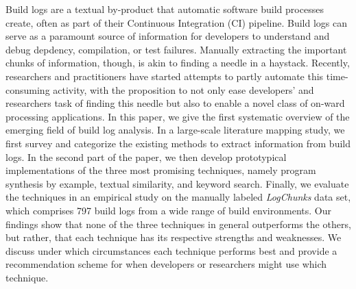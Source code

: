 Build logs are a textual by-product that automatic software build processes
create, often as part of their Continuous Integration (CI)
pipeline.
Build logs can serve as a paramount source of
information for developers to understand and debug depdency, compilation, or
test failures.
Manually
extracting the important chunks of information, though, is akin to
finding a needle in a haystack.
Recently, researchers and practitioners have started attempts to partly
automate
this time-consuming activity, with the proposition to not only ease
developers' and researchers task of finding this needle but also to enable a novel class of
on-ward processing applications.
In this paper, we give the first systematic overview of the emerging field of build log analysis.
In a large-scale literature mapping study, we first survey and categorize the existing methods to
extract information from build logs.
In the second part of the paper, we then develop prototypical implementations of the three most promising
techniques, namely program synthesis
by example, textual similarity, and keyword search.
Finally, we evaluate the techniques in an empirical study on
the manually
labeled \emph{LogChunks} data set, which comprises 797 build logs 
from a wide range of build environments.
Our findings show that none of the three techniques in general outperforms
the others, but rather, that each technique has its respective strengths
and weaknesses.
We discuss under which circumstances each technique performs best
and provide a recommendation scheme for when developers or researchers might 
use which technique.
